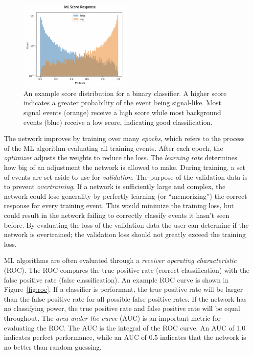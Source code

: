 \begin{figure}[!htbp]
\centering
   \includegraphics[width=0.5\textwidth]{figures/ml/ml_score_example}
    \caption{An example score distribution for a binary classifier. A higher score indicates a greater probability of the event being signal-like. Most signal events (orange) receive a high score while most background events (blue) receive a low score, indicating good classification.
    \label{fig:score_example}}
\end{figure}

The network improves by training over many \textit{epochs}, which refers to the process of the ML algorithm evaluating all training events.
After each epoch, the \textit{optimizer} adjusts the weights to reduce the loss.
The \textit{learning rate} determines how big of an adjustment the network is allowed to make. 
During training, a set of events are set aside to use for \textit{validation}.
The purpose of the validation data is to prevent \textit{overtraining}.
If a network is sufficiently large and complex, the network could lose generality by perfectly learning (or ``memorizing'') the correct response for every training event.
This would minimize the training loss, but could result in the network failing to correctly classify events it hasn't seen before. 
By evaluating the loss of the validation data the user can determine if the network is overtrained; the validation loss should not greatly exceed the training loss.

ML algorithms are often evaluated through a \textit{receiver operating characteristic} (ROC). 
The ROC compares the true positive rate (correct classification) with the false positive rate (false classification).
An example ROC curve is shown in Figure~\ref{fig:roc}. 
If a classifier is performant, the true positive rate will be larger than the false positive rate for all possible false positive rates.
If the network has no classifying power, the true positive rate and false positive rate will be equal throughout.
The \textit{area under the curve} (AUC) is an important metric for evaluating the ROC.
The AUC is the integral of the ROC curve.
An AUC of 1.0 indicates perfect performance, while an AUC of 0.5 indicates that the network is no better than random guessing.

